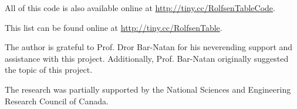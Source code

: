 \begin{paper}
All of this code is also available online at
\url{http://tiny.cc/RolfsenTableCode}.


\noindent{}



\noindent{}










\noindent{}

\fontsize{12pt}{12pt}\selectfont
{}


This list can be found online at \url{http://tiny.cc/RolfsenTable}.


The author is grateful to Prof. Dror Bar-Natan for his neverending support and
assistance with this project.
Additionally, Prof. Bar-Natan originally suggested the topic of this project.

The research was partially supported by
the National Sciences and Engineering Research
Council of Canada.


\end{paper}
